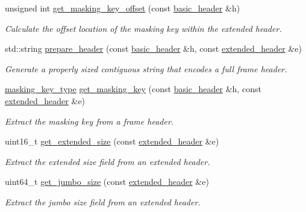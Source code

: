 \begin{DoxyCompactItemize}
unsigned int \hyperlink{namespacewebsocketpp_1_1frame_a001d6c5e538d5eb1ef5ddc21aeb61ee3}{get\+\_\+masking\+\_\+key\+\_\+offset} (const \hyperlink{structwebsocketpp_1_1frame_1_1basic__header}{basic\+\_\+header} \&h)
\begin{DoxyCompactList}\small\item\em Calculate the offset location of the masking key within the extended header. \end{DoxyCompactList}\item 
std\+::string \hyperlink{namespacewebsocketpp_1_1frame_ae63c3e01399a6787ed09b710853344a4}{prepare\+\_\+header} (const \hyperlink{structwebsocketpp_1_1frame_1_1basic__header}{basic\+\_\+header} \&h, const \hyperlink{structwebsocketpp_1_1frame_1_1extended__header}{extended\+\_\+header} \&e)
\begin{DoxyCompactList}\small\item\em Generate a properly sized contiguous string that encodes a full frame header. \end{DoxyCompactList}\item 
\hyperlink{namespacewebsocketpp_1_1frame_a8bdac8ec44c78c027fcf55aa3bad3f86}{masking\+\_\+key\+\_\+type} \hyperlink{namespacewebsocketpp_1_1frame_aed7edd146ce3aa5b87adc9fcc5fcb10f}{get\+\_\+masking\+\_\+key} (const \hyperlink{structwebsocketpp_1_1frame_1_1basic__header}{basic\+\_\+header} \&h, const \hyperlink{structwebsocketpp_1_1frame_1_1extended__header}{extended\+\_\+header} \&e)
\begin{DoxyCompactList}\small\item\em Extract the masking key from a frame header. \end{DoxyCompactList}\item 
uint16\+\_\+t \hyperlink{namespacewebsocketpp_1_1frame_a5ae0cc87ac44bb78c5dc41983c43a0c4}{get\+\_\+extended\+\_\+size} (const \hyperlink{structwebsocketpp_1_1frame_1_1extended__header}{extended\+\_\+header} \&e)
\begin{DoxyCompactList}\small\item\em Extract the extended size field from an extended header. \end{DoxyCompactList}\item 
uint64\+\_\+t \hyperlink{namespacewebsocketpp_1_1frame_ac55b672bcd3baf4c5a074816f6eb035b}{get\+\_\+jumbo\+\_\+size} (const \hyperlink{structwebsocketpp_1_1frame_1_1extended__header}{extended\+\_\+header} \&e)
\begin{DoxyCompactList}\small\item\em Extract the jumbo size field from an extended header. \end{DoxyCompactList}\item 

\end{DoxyCompactItemize}
